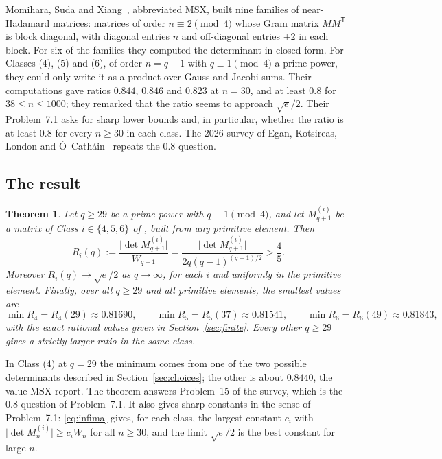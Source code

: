 \documentclass[11pt]{article}
\newtheorem{theorem}{Theorem}[section]
\newcommand{\abs}[1]{\lvert#1\rvert}
\begin{document}
Momihara, Suda and Xiang~\cite{MSX}, abbreviated MSX, built nine
families of near-Hadamard matrices: matrices of order $n\equiv2\pmod4$
whose Gram matrix $MM^{\mathsf T}$ is block diagonal, with diagonal
entries $n$ and off-diagonal entries $\pm2$ in each block. For six of the families they computed the determinant in closed
form. For Classes (4), (5) and (6), of order $n=q+1$ with $q\equiv1\pmod4$
a prime power, they could only write it as a product over Gauss and Jacobi
sums. Their computations gave ratios $0.844$, $0.846$ and $0.823$ at
$n=30$, and at least $0.8$ for $38\le n\le1000$; they remarked that the
ratio seems to approach $\sqrt e/2$. Their Problem~7.1 asks for sharp lower
bounds and, in particular, whether the ratio is at least $0.8$ for every
$n\ge30$ in each class. The 2026 survey of Egan, Kotsireas, London and
\'O~Cath\'ain~\cite[\S5.6, Problem 15]{EKLO} repeats the $0.8$ question.

\subsection{The result}
\begin{theorem}\label{thm:main}
Let $q\ge29$ be a prime power with $q\equiv1\pmod4$, and let
$M^{(i)}_{q+1}$ be a matrix of Class $i\in\{4,5,6\}$ of
\cite[Theorem 1.6]{MSX}, built from any primitive element. Then
\begin{equation}\label{eq:target}
 R_i(q):=\frac{\abs{\det M^{(i)}_{q+1}}}{W_{q+1}}
 =\frac{\abs{\det M^{(i)}_{q+1}}}{2q(q-1)^{(q-1)/2}}>\frac45 .
\end{equation}
Moreover $R_i(q)\to\sqrt e/2$ as $q\to\infty$, for each $i$ and
uniformly in the primitive element. Finally, over all $q\ge29$ and all
primitive elements, the smallest values are
\begin{equation}\label{eq:infima}
 \min R_4=R_4(29)\approx0.81690,\qquad
 \min R_5=R_5(37)\approx0.81541,\qquad
 \min R_6=R_6(49)\approx0.81843,
\end{equation}
with the exact rational values given in Section~\ref{sec:finite}. Every
other $q\ge29$ gives a strictly larger ratio in the same class.
\end{theorem}

In Class (4) at $q=29$ the minimum comes from one of the two possible
determinants described in Section~\ref{sec:choices}; the other is about
$0.8440$, the value MSX report. The theorem answers Problem~15 of the
survey, which is the $0.8$ question of Problem~7.1. It also gives sharp
constants in the sense of Problem~7.1: \eqref{eq:infima} gives, for each
class, the largest constant $c_i$ with $\abs{\det M^{(i)}_n}\ge c_iW_n$
for all $n\ge30$, and the limit $\sqrt e/2$ is the best constant for
large $n$.
\end{document}

